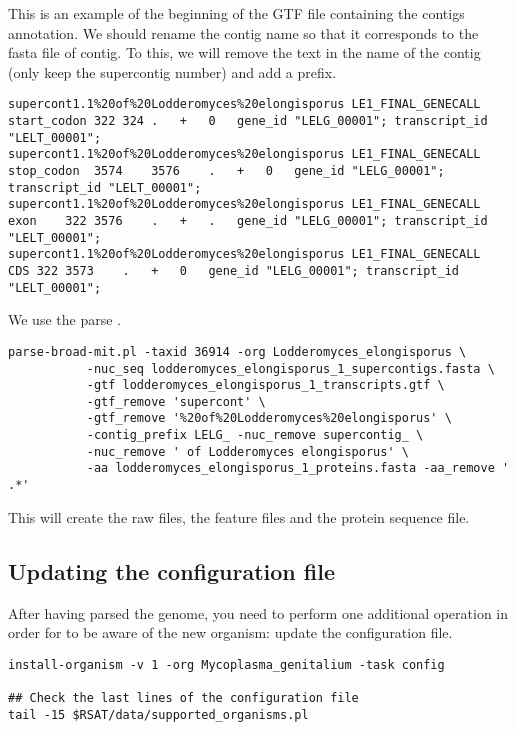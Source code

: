 This is an example of the beginning of the GTF file containing the contigs annotation. We should rename the contig
name so that it corresponds to the fasta file of contig. To this, we will remove the text in the name of the contig (only keep the supercontig number)
and add a prefix.
\begin{footnotesize}
\begin{verbatim}
supercont1.1%20of%20Lodderomyces%20elongisporus	LE1_FINAL_GENECALL	start_codon	322	324	.	+	0	gene_id "LELG_00001"; transcript_id "LELT_00001";
supercont1.1%20of%20Lodderomyces%20elongisporus	LE1_FINAL_GENECALL	stop_codon	3574	3576	.	+	0	gene_id "LELG_00001"; transcript_id "LELT_00001";
supercont1.1%20of%20Lodderomyces%20elongisporus	LE1_FINAL_GENECALL	exon	322	3576	.	+	.	gene_id "LELG_00001"; transcript_id "LELT_00001";
supercont1.1%20of%20Lodderomyces%20elongisporus	LE1_FINAL_GENECALL	CDS	322	3573	.	+	0	gene_id "LELG_00001"; transcript_id "LELT_00001";
\end{verbatim}
\end{footnotesize}
We use the parse .
\begin{footnotesize}
\begin{verbatim}
parse-broad-mit.pl -taxid 36914 -org Lodderomyces_elongisporus \
		   -nuc_seq lodderomyces_elongisporus_1_supercontigs.fasta \
		   -gtf lodderomyces_elongisporus_1_transcripts.gtf \
		   -gtf_remove 'supercont' \
		   -gtf_remove '%20of%20Lodderomyces%20elongisporus' \
		   -contig_prefix LELG_ -nuc_remove supercontig_ \
		   -nuc_remove ' of Lodderomyces elongisporus' \
		   -aa lodderomyces_elongisporus_1_proteins.fasta -aa_remove ' .*'
\end{verbatim}
\end{footnotesize}

This will create the raw files, the feature files and the protein sequence file.

\subsection{Updating the configuration file}

After having parsed the genome, you need to perform one additional
operation in order for \RSAT to be aware of the new organism: update
the configuration file.

\begin{footnotesize}
\begin{verbatim}
install-organism -v 1 -org Mycoplasma_genitalium -task config

## Check the last lines of the configuration file
tail -15 $RSAT/data/supported_organisms.pl
\end{verbatim}
\end{footnotesize}

